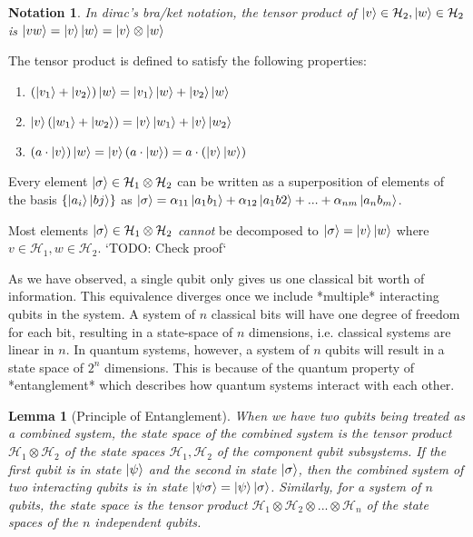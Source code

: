\documentclass[12pt,twoside]{report}
\newtheorem{notation}[subsection]{Notation}
\newtheorem{lemma}[subsection]{Lemma}
\begin{document}
\begin{notation}
    In dirac's bra/ket notation, the tensor product of $\ket{v} \in \mathcal{H}_2, \ket{w} \in \mathcal{H}_2$ is $\ket{vw} = \ket{v}\ket{w} = \ket{v} \otimes \ket{w}$
\end{notation}

The tensor product is defined to satisfy the following properties:
\begin{enumerate}
    \item $(\ket{v_1} + \ket{v_2} ) \ket{w} = \ket{v_1}\ket{w} + \ket{v_2}\ket{w}$
    \item $\ket{v}(\ket{w_1} + \ket{w_2}) =  \ket{v}\ket{w_1} + \ket{v}\ket{w_2}$
    \item $(a \cdot \ket{v})\ket{w} = \ket{v}(a \cdot \ket{w})  = a \cdot (\ket{v}\ket{w})$
\end{enumerate}
Every element $\ket{\sigma} \in \mathcal{H}_1 \otimes \mathcal{H}_2$ can be written as a superposition of elements of the basis $\{ \ket{a_i}\ket{bj} \}$ as $\ket{\sigma} = \alpha_{11} \ket{a_1 b_1} + \alpha_{12} \ket{a_1 b2} + ... + \alpha_{nm} \ket{a_n b_m}$.

Most elements $\ket{\sigma} \in \mathcal{H}_1 \otimes \mathcal{H}_2$ \textit{cannot} be decomposed to $\ket{\sigma} = \ket{v}\ket{w}$ where $v \in \mathcal{H}_1, w \in \mathcal{H}_2$.
`TODO: Check proof`

As we have observed, a single qubit only gives us one classical bit worth of information. This equivalence diverges once we include *multiple* interacting qubits in the system. A system of $n$ classical bits will have one degree of freedom for each bit, resulting in a state-space of $n$ dimensions, i.e. classical systems are linear in $n$. In quantum systems, however, a system of $n$ qubits will result in a state space of $2^n$ dimensions. This is because of the quantum property of *entanglement* which describes how quantum systems interact with each other.

\begin{lemma}[Principle of Entanglement]
When we have two qubits being treated as a combined system, the state space of the combined system is the tensor product $\mathcal{H}_1 \otimes \mathcal{H}_2$ of the state spaces $\mathcal{H}_1, \mathcal{H}_2$ of the component qubit subsystems. If the first qubit is in state $\ket{\psi}$ and the second in state $\ket{\sigma}$, then the combined system of two interacting qubits is in state $\ket{\psi\sigma} = \ket{\psi}\ket{\sigma}$. Similarly, for a system of $n$ qubits, the state space is the tensor product $\mathcal{H}_1 \otimes \mathcal{H}_2 \otimes ... \otimes \mathcal{H}_n$ of the state spaces of the $n$ independent qubits.
\end{lemma}
\end{document}
